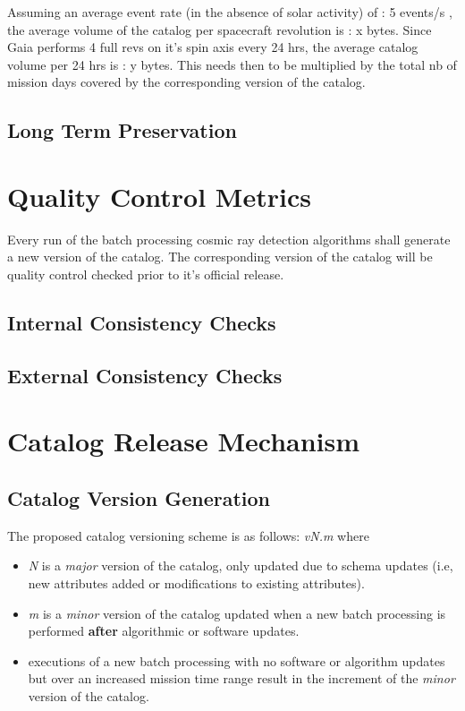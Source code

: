 \documentclass[a4paper, 11pt]{article}
\begin{document}
Assuming an average event rate (in the absence of solar activity) of : 5 events/s , the average volume of the catalog per spacecraft revolution is : x bytes. Since Gaia performs 4 full revs on it's spin axis every 24 hrs, the average catalog volume per 24 hrs is : y bytes. This needs then to be multiplied by the total nb of mission days covered by the corresponding version of the catalog. 

\subsection{Long Term Preservation}

\section{Quality Control Metrics}
\label{sec:metrics}
Every run of the batch processing cosmic ray detection algorithms shall generate a new version of the catalog. The corresponding version of the catalog will be quality control checked prior to it's official release.

\subsection{Internal Consistency Checks}

\subsection{External Consistency Checks}

\section{Catalog Release Mechanism}
\label{sec:release}
\subsection{Catalog Version Generation}

The proposed catalog versioning scheme is as follows: \newline\newline  \textit{vN.m} \newline\newline where 

\begin{itemize}
\item \textit{N} is a \textit{major} version of the catalog, only updated due to schema updates (i.e, new attributes added or modifications to existing attributes).
\item \textit{m} is a \textit{minor} version of the catalog updated when a new batch processing is performed \textbf{after} algorithmic or software updates. 
\item executions of a new batch processing with no software or algorithm updates but over an increased mission time range result in the increment of the \textit{minor} version of the catalog.

\end{itemize}
\end{document}
